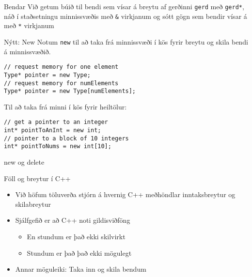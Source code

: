 \documentclass{beamer}
\begin{document}
\begin{frame}[fragile]{Bendar}
    Við getum búið til bendi sem vísar á breytu af gerðinni \texttt{gerd} með \texttt{gerd*}, náð í  staðsetningu minnissvæðis með \texttt{\&} virkjanum og sótt gögn sem bendir vísar á með \texttt{*} virkjanum

\end{frame}

\begin{frame}[fragile]{Nýtt: New}
    Notum \texttt{new} til að taka frá minnissvæði í kös fyrir breytu og skila bendi á minnissvæðið.
    \begin{verbatim}
// request memory for one element
Type* pointer = new Type;
// request memory for numElements
Type* pointer = new Type[numElements];
    \end{verbatim}
    Til að taka frá minni í kös fyrir heiltölur:
    \begin{verbatim}
// get a pointer to an integer
int* pointToAnInt = new int;
// pointer to a block of 10 integers
int* pointToNums = new int[10];
    \end{verbatim}
\end{frame}

\begin{frame}[fragile]{new og delete}


\end{frame}

\begin{frame}{Föll og breytur í C++}
    \begin{itemize}
        \item Við höfum töluverða stjórn á hvernig C++ meðhöndlar inntaksbreytur og skilabreytur
        \item Sjálfgefið er að C++ noti gildisviðföng 
        \begin{itemize}
            \item En stundum er það ekki skilvirkt
            \item Stundum er það það ekki mögulegt
        \end{itemize}
        \item Annar möguleiki: Taka inn og skila bendum
    \end{itemize}
\end{frame}
\end{document}
